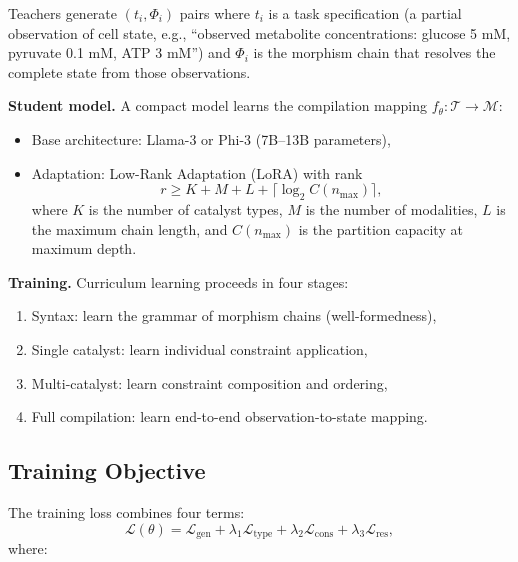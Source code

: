 \documentclass[twocolumn,10pt,a4paper]{article}
\theoremstyle{definition}
\theoremstyle{remark}
\newcommand{\morphism}{\Phi}
\begin{document}
Teachers generate $(t_i, \morphism_i)$ pairs where $t_i$ is a task specification (a partial observation of cell state, e.g., ``observed metabolite concentrations: glucose 5 mM, pyruvate 0.1 mM, ATP 3 mM'') and $\morphism_i$ is the morphism chain that resolves the complete state from those observations.

\textbf{Student model.} A compact model learns the compilation mapping $f_\theta: \mathcal{T} \to \mathcal{M}$:
\begin{itemize}[nosep]
    \item Base architecture: Llama-3 or Phi-3 (7B--13B parameters),
    \item Adaptation: Low-Rank Adaptation (LoRA) \citep{Hu2022} with rank
    \begin{equation}
        r \geq K + M + L + \lceil \log_2 C(n_{\max}) \rceil,
        \label{eq:lora_rank}
    \end{equation}
    where $K$ is the number of catalyst types, $M$ is the number of modalities, $L$ is the maximum chain length, and $C(n_{\max})$ is the partition capacity at maximum depth.
\end{itemize}

\textbf{Training.} Curriculum learning \citep{Bengio2009} proceeds in four stages:
\begin{enumerate}[nosep]
    \item Syntax: learn the grammar of morphism chains (well-formedness),
    \item Single catalyst: learn individual constraint application,
    \item Multi-catalyst: learn constraint composition and ordering,
    \item Full compilation: learn end-to-end observation-to-state mapping.
\end{enumerate}

\subsection{Training Objective}

The training loss combines four terms:
\begin{equation}
    \mathcal{L}(\theta) = \mathcal{L}_{\mathrm{gen}} + \lambda_1 \mathcal{L}_{\mathrm{type}} + \lambda_2 \mathcal{L}_{\mathrm{cons}} + \lambda_3 \mathcal{L}_{\mathrm{res}},
    \label{eq:loss}
\end{equation}
where:
\end{document}

